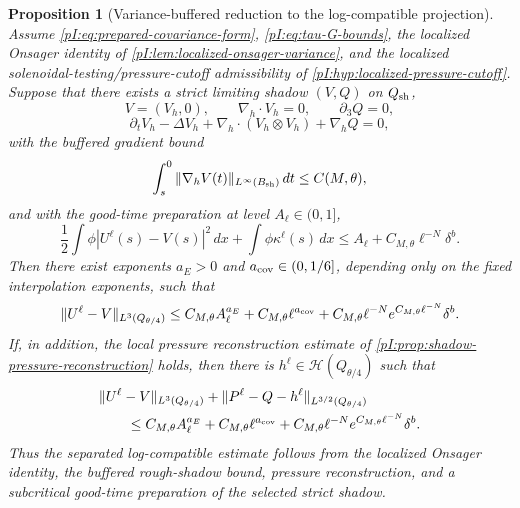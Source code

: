 \documentclass[11pt]{article}
\numberwithin{equation}{section}
\theoremstyle{plain}
\newtheorem{proposition}{Proposition}[section]
\theoremstyle{definition}
\theoremstyle{remark}
\newcommand{\nabh}{\nabla_h}
\newcommand{\divh}{\nabla_h\!\cdot}
\newcommand{\calH}{\mathcal H}
\begin{document}
\begin{proposition}[Variance-buffered reduction to the log-compatible projection]\label{pI:prop:variance-buffered-reduction}
Assume \eqref{pI:eq:prepared-covariance-form}, \eqref{pI:eq:tau-G-bounds}, the localized Onsager identity of \cref{pI:lem:localized-onsager-variance}, and the localized solenoidal-testing/pressure-cutoff admissibility of \cref{pI:hyp:localized-pressure-cutoff}.  Suppose that there exists a strict limiting shadow \((V,Q)\) on \(Q_{\rm sh}\),
\[
        V=(V_h,0),\qquad \divh V_h=0,
        \qquad \partial_3Q=0,
\]
\begin{equation}\label{pI:eq:strict-shadow-equation-reduction}
        \partial_tV_h-
        \Delta V_h+
        \divh(V_h\otimes V_h)+\nabh Q=0,
\end{equation}
with the buffered gradient bound
\begin{equation}\label{pI:eq:buffered-gradient-bound-reduction}
        \int_s^0\|\nabh V(t)\|_{L^\infty(B_{\rm sh})}\,dt
        \le C(M,\theta),
\end{equation}
and with the good-time preparation at level \(A_\ell\in(0,1]\),
\begin{equation}\label{pI:eq:good-time-relative-entropy-preparation}
        \frac12\int\phi|U^\ell(s)-V(s)|^2\,dx
        +\int\phi\kappa^\ell(s)\,dx
        \le A_\ell+C_{M,\theta}\ell^{-N}\delta^b.
\end{equation}
Then there exist exponents \(a_E>0\) and \(a_{\rm cov}\in(0,1/6]\), depending only on the fixed interpolation exponents, such that
\begin{equation}\label{pI:eq:velocity-output-reduction}
        \|U^\ell-V\|_{L^3(Q_{\theta/4})}
        \le
        C_{M,\theta}A_\ell^{a_E}
        +C_{M,\theta}\ell^{a_{\rm cov}}
        +C_{M,\theta}\ell^{-N}e^{C_{M,\theta}\ell^{-N}}\delta^b.
\end{equation}
If, in addition, the local pressure reconstruction estimate of \cref{pI:prop:shadow-pressure-reconstruction} holds, then there is \(h^\ell\in\calH(Q_{\theta/4})\) such that
\begin{equation}\label{pI:eq:pressure-output-reduction}
\begin{aligned}
        &\|U^\ell-V\|_{L^3(Q_{\theta/4})}
        +\|P^\ell-Q-h^\ell\|_{L^{3/2}(Q_{\theta/4})}
        \\
        &\qquad\le
        C_{M,\theta}A_\ell^{a_E}
        +C_{M,\theta}\ell^{a_{\rm cov}}
        +C_{M,\theta}\ell^{-N}e^{C_{M,\theta}\ell^{-N}}\delta^b .
\end{aligned}
\end{equation}
Thus the separated log-compatible estimate follows from the localized Onsager identity, the buffered rough-shadow bound, pressure reconstruction, and a subcritical good-time preparation of the selected strict shadow.
\end{proposition}
\end{document}
